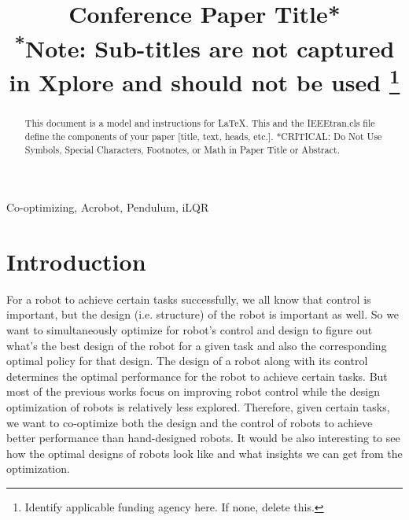 \documentclass[conference]{IEEEtran}
\begin{document}
\title{Conference Paper Title*\\
{\footnotesize \textsuperscript{*}Note: Sub-titles are not captured in Xplore and
should not be used}
\thanks{Identify applicable funding agency here. If none, delete this.}
}

\author{
\and
{}
}

\maketitle

\begin{abstract}
This document is a model and instructions for \LaTeX.
This and the IEEEtran.cls file define the components of your paper [title, text, heads, etc.]. *CRITICAL: Do Not Use Symbols, Special Characters, Footnotes, 
or Math in Paper Title or Abstract.
\end{abstract}

\begin{IEEEkeywords}
Co-optimizing, Acrobot, Pendulum, iLQR
\end{IEEEkeywords}


\section{Introduction}

For a robot to achieve certain tasks successfully, we all know that control is important, but the design (i.e. structure) of the robot is important as well. So we want to simultaneously optimize for robot's control and design to figure out what's the best design of the robot for a given task and also the corresponding optimal policy for that design. The design of a robot along with its control determines the optimal performance for the robot to achieve certain tasks. But most of the previous works focus on improving robot control while the design optimization of robots is relatively less explored. Therefore, given certain tasks, we want to co-optimize both the design and the control of robots to achieve better performance than hand-designed robots. It would be also interesting to see how the optimal designs of robots look like and what insights we can get from the optimization.
\end{document}
